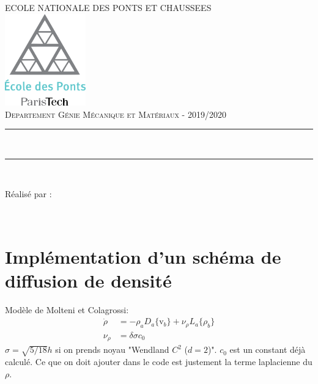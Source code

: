 \documentclass{article}
\begin{document}
\begin{titlepage}
	\thispagestyle{empty}
	\newcommand{\HRule}{\rule{\linewidth}{0.5mm}}
	\center
	\textsc{\large ECOLE NATIONALE DES PONTS ET CHAUSSEES}\\[.7cm]
	\includegraphics[width=35mm]{img/ENPC_logo.png}\\[.5cm]
	\textsc{\large Departement Génie Mécanique et Matériaux - 2019/2020}\\[0.5cm]
	
	\vspace{2cm}
	
	\HRule \\[0.4cm]
	{\LARGE {\selectfont {SPH : Projet}}
    \vspace{0.4cm}
	\HRule \\[.5cm]

\vspace{3cm}

\large Réalisé par : 

\vspace{0.5cm}

{}
\\
\vspace{1cm}


}
\end{titlepage}


\newpage
\section{Implémentation d'un schéma de diffusion de densité}
Modèle de Molteni et Colagrossi: 
\begin{align*}
	\dot{\rho} &= -\rho_{a}D_{a}\{\text{v}_{b}\}+\nu_{\rho}L_{a}\{\rho_{b}\}\\
	\nu_{\rho} &= \delta\sigma c_{0} 
\end{align*}
$\sigma=\sqrt{5/18}h$ si on prends noyau "Wendland $C^2$ ($d=2$)". $c_0$ est un constant déjà calculé. Ce que on doit ajouter dans le code est justement la terme laplacienne du $\rho$.
\end{document}
